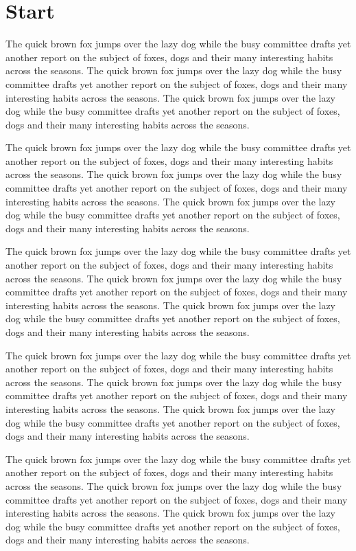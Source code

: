 \documentclass{article}
\begin{document}
\section{Start}\label{start}
The quick brown fox jumps over the lazy dog while the busy committee drafts yet another report on the subject of foxes, dogs and their many interesting habits across the seasons. The quick brown fox jumps over the lazy dog while the busy committee drafts yet another report on the subject of foxes, dogs and their many interesting habits across the seasons. The quick brown fox jumps over the lazy dog while the busy committee drafts yet another report on the subject of foxes, dogs and their many interesting habits across the seasons. 

The quick brown fox jumps over the lazy dog while the busy committee drafts yet another report on the subject of foxes, dogs and their many interesting habits across the seasons. The quick brown fox jumps over the lazy dog while the busy committee drafts yet another report on the subject of foxes, dogs and their many interesting habits across the seasons. The quick brown fox jumps over the lazy dog while the busy committee drafts yet another report on the subject of foxes, dogs and their many interesting habits across the seasons. 

The quick brown fox jumps over the lazy dog while the busy committee drafts yet another report on the subject of foxes, dogs and their many interesting habits across the seasons. The quick brown fox jumps over the lazy dog while the busy committee drafts yet another report on the subject of foxes, dogs and their many interesting habits across the seasons. The quick brown fox jumps over the lazy dog while the busy committee drafts yet another report on the subject of foxes, dogs and their many interesting habits across the seasons. 

The quick brown fox jumps over the lazy dog while the busy committee drafts yet another report on the subject of foxes, dogs and their many interesting habits across the seasons. The quick brown fox jumps over the lazy dog while the busy committee drafts yet another report on the subject of foxes, dogs and their many interesting habits across the seasons. The quick brown fox jumps over the lazy dog while the busy committee drafts yet another report on the subject of foxes, dogs and their many interesting habits across the seasons. 

The quick brown fox jumps over the lazy dog while the busy committee drafts yet another report on the subject of foxes, dogs and their many interesting habits across the seasons. The quick brown fox jumps over the lazy dog while the busy committee drafts yet another report on the subject of foxes, dogs and their many interesting habits across the seasons. The quick brown fox jumps over the lazy dog while the busy committee drafts yet another report on the subject of foxes, dogs and their many interesting habits across the seasons. 
\end{document}
